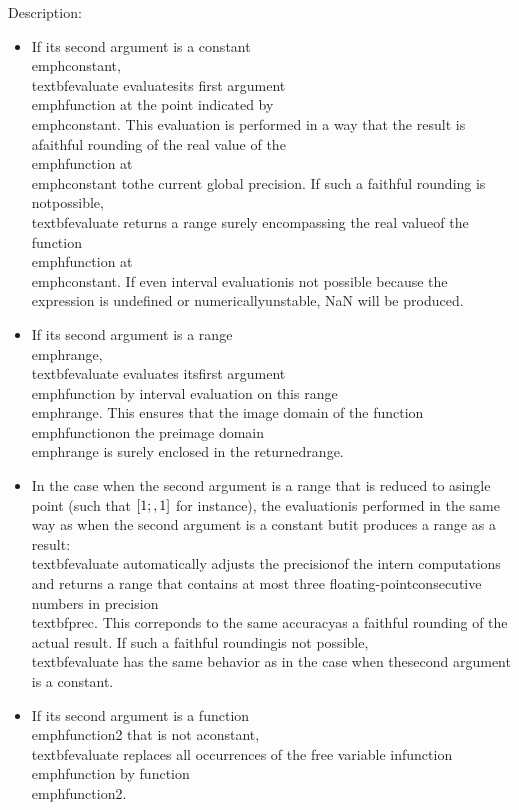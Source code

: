 \noindent Description: \begin{itemize}

\item If its second argument is a constant \\emph{constant}, \\textbf{evaluate} evaluates\n   its first argument \\emph{function} at the point indicated by\n   \\emph{constant}. This evaluation is performed in a way that the result is a\n   faithful rounding of the real value of the \\emph{function} at \\emph{constant} to\n   the current global precision. If such a faithful rounding is not\n   possible, \\textbf{evaluate} returns a range surely encompassing the real value\n   of the function \\emph{function} at \\emph{constant}. If even interval evaluation\n   is not possible because the expression is undefined or numerically\n   unstable, NaN will be produced.\n
\item If its second argument is a range \\emph{range}, \\textbf{evaluate} evaluates its\n   first argument \\emph{function} by interval evaluation on this range\n   \\emph{range}. This ensures that the image domain of the function \\emph{function}\n   on the preimage domain \\emph{range} is surely enclosed in the returned\n   range.\n
\item In the case when the second argument is a range that is reduced to a\n   single point (such that $[1;\\,1]$ for instance), the evaluation\n   is performed in the same way as when the second argument is a constant but\n   it produces a range as a result: \\textbf{evaluate} automatically adjusts the precision\n   of the intern computations and returns a range that contains at most three floating-point\n   consecutive numbers in precision \\textbf{prec}. This correponds to the same accuracy\n   as a faithful rounding of the actual result. If such a faithful rounding\n   is not possible, \\textbf{evaluate} has the same behavior as in the case when the\n   second argument is a constant.\n
\item If its second argument is a function \\emph{function2} that is not a\n   constant, \\textbf{evaluate} replaces all occurrences of the free variable in\n   function \\emph{function} by function \\emph{function2}.\n\end{itemize}
